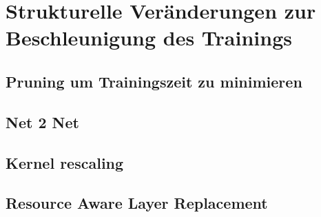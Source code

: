 \section{Strukturelle Veränderungen zur Beschleunigung des Trainings}

\subsection{Pruning um Trainingszeit zu minimieren}

\subsection{Net 2 Net}


\subsection{Kernel rescaling}


\subsection{Resource Aware Layer Replacement}

